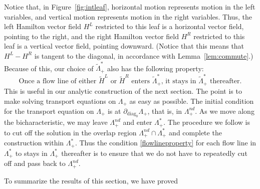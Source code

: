 \documentclass[10pt, a4paper, twoside]{amsart}
\numberwithin{equation}{section}
\theoremstyle{remark}
\begin{document}
Notice that, in Figure~\ref{fig:intleaf}, horizontal motion represents motion in the left variables, and vertical motion represents motion in the right variables. Thus, the left Hamilton vector field $H^L$ restricted to this leaf is a horizontal vector field, pointing to the right, and the right Hamilton vector field $H^R$ restricted to this leaf is a vertical vector field,  pointing downward. 
(Notice that this means that $H^L - H^R$ is tangent to the diagonal, in accordance with Lemma~\ref{lem:commute}.) 
Because of this, our choice of ${\tilde \Lambda}_+^*$ also has the following property:
\begin{equation}
\text{Once a flow line of either ${\tilde H^L}$ or ${\tilde H^R}$ enters ${\tilde \Lambda}_+^*$, it stays in ${\tilde \Lambda}_+^*$ thereafter.}
\label{flowlineproperty}\end{equation}
This is useful in our analytic construction of the next section. The point is to make solving transport equations on $\Lambda_+$ as easy as possible. The initial condition for the transport equation on $\Lambda_+$ is at $\partial_{\mathrm{diag}_0} \Lambda_+$, that is, in $\Lambda_+^{nd}$. As we move along the bicharacteristic, we may leave $\Lambda_+^{nd}$ and enter $\Lambda_+^*$. The procedure we follow is to cut off the solution in the overlap region $\Lambda_+^{nd} \cap \Lambda_+^*$ and complete the construction within $\Lambda_+^*$. Thus the condition \eqref{flowlineproperty} for each flow line in $\Lambda_+^*$ to stays in $\Lambda_+^*$ thereafter is to ensure that we do not have to repeatedly cut off and pass back to $\Lambda_+^{nd}$. 

To summarize the results of this section, we have proved
\end{document}
